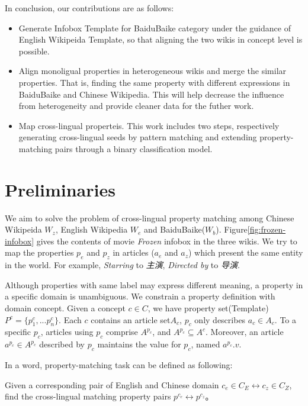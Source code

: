 \documentclass[runningheads,a4paper]{llncs}
\begin{document}
In conclusion, our contributions are as follows:
\begin{itemize}
\item Generate Infobox Template for BaiduBaike category under the guidance of English Wikipeida Template, so that aligning the two wikis in concept level is possible.
\item Align monoligual properties in heterogeneous wikis and merge the similar properties. That is, finding the same property with different expressions in BaiduBaike and Chinese Wikipedia. This will help decrease the influence from heterogeneity and provide cleaner data for the futher work.
\item Map cross-lingual properteis. This work includes two steps, respectively generating cross-lingual seeds by pattern matching and extending property-matching pairs through a binary classification model.
\end{itemize}

\section{Preliminaries}
We aim to solve the problem of cross-lingual property matching among Chinese Wikipeida $W_z$, English Wikipedia $W_e$ and BaiduBaike($W_b$). Figure\ref{fig:frozen-infobox} gives the contents of movie \emph{Frozen} infobox in the three wikis. We try to map the properties $p_e$ and $p_z$ in articles ($a_e$ and $a_z$) which present the same entity in the world. For example, \emph{Starring} to \emph{主演}, \emph{Directed by} to \emph{导演}.

Although properties with same label may express different meaning, a property in a specific domain is unambiguous. We constrain a property definition with domain concept. Given a concept $c \in C$, we have property set(Template) $P^c=\{p^c_1,...p^c_n\}$. Each $c$ contains an article set$A_c$, $p_c$ only describes $a_c \in A_c$. To a specific $p_c$, articles using $p_c$ comprise $A^{p_c}$, and $A^{p_c} \subseteq A^c$. Moreover, an article $a^{p_c} \in A^{p_c}$ described by $p_c$ maintains the value for $p_c$, named $a^{p_c}.v$.

In a word, property-matching task can be defined as following:
\begin{definition}
Given a corresponding pair of English and Chinese domain $c_e \in C_E \leftrightarrow c_z \in C_Z$, find the cross-lingual matching property pairs $p^{c_e} \leftrightarrow p^{c_z}$。
\end{definition}
\end{document}
